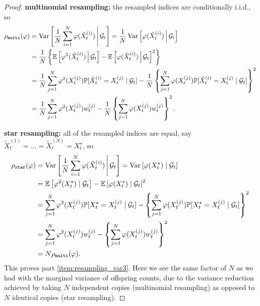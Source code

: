 \begin{proof}
\textbf{multinomial resampling:} the resampled indices are conditionally i.i.d., so
\begin{align*}
\rho_{\texttt{multi}}(\varphi)
&= \operatorname{Var}\left[ \frac{1}{N} \sum_{i=1}^N \varphi (\tilde{X}_t^{(i)}) 
        \,\middle|\, \mathcal{G}_t \right]
= \frac{1}{N} \operatorname{Var}\left[ \varphi (\tilde{X}_t^{(i)}) 
        \,\middle|\, \mathcal{G}_t \right] \\
&= \frac{1}{N} \left\{ \mathbb{E}\left[ \varphi^2(\tilde{X}_t^{(i)}) \,\middle|\, \mathcal{G}_t \right]
        - \mathbb{E}\left[ \varphi(\tilde{X}_t^{(i)}) \,\middle|\, \mathcal{G}_t \right]^2 \right\} \\
&= \frac{1}{N} \sum_{j=1}^N \varphi^2(X_t^{(j)}) 
        \mathbb{P}[\tilde{X}_t^{(i)} = X_t^{(j)} \mid \mathcal{G}_t ]
        - \frac{1}{N} \left\{ \sum_{j=1}^N \varphi(X_t^{(j)}) 
        \mathbb{P}[\tilde{X}_t^{(i)} = X_t^{(j)} \mid \mathcal{G}_t ] \right\}^2 \\
&= \frac{1}{N} \sum_{j=1}^N \varphi^2(X_t^{(j)}) w_t^{(j)}
        - \frac{1}{N} \left\{ \sum_{j=1}^N \varphi(X_t^{(j)}) w_t^{(j)} \right\}^2 .        
\end{align*}

\textbf{star resampling:} all of the resampled indices are equal, say $\tilde{X}_t^{(1)} = \dots = \tilde{X}_t^{(N)} = X_t^\star$, so
\begin{align*}
\rho_{\texttt{star}}(\varphi)
&= \operatorname{Var}\left[ \frac{1}{N} \sum_{i=1}^N \varphi(\tilde{X}_t^{(i)}) \,\middle|\, \mathcal{G}_t \right]
= \operatorname{Var}\left[ \varphi( X_t^\star) \mid \mathcal{G}_t \right] \\
&= \mathbb{E}\left[ \varphi^2( X_t^\star) \mid \mathcal{G}_t \right]
        - \mathbb{E}\left[ \varphi( X_t^\star) \mid \mathcal{G}_t \right]^2 \\
&= \sum_{j=1}^N \varphi^2(X_t^{(j)}) 
        \mathbb{P}[ X_t^\star = X_t^{(j)} \mid \mathcal{G}_t ]
        - \left\{ \sum_{j=1}^N \varphi(X_t^{(j)}) 
        \mathbb{P}[ X_t^\star = X_t^{(j)} \mid \mathcal{G}_t ] \right\}^2 \\
&= \sum_{j=1}^N \varphi^2(X_t^{(j)}) w_t^{(j)}
        - \left\{ \sum_{j=1}^N \varphi(X_t^{(j)}) w_t^{(j)} \right\}^2 \\
&= N \rho_{\texttt{multi}}(\varphi) .
\end{align*}
 This proves part \ref{item:resampling_var3}. Here we see the same factor of $N$ as we had with the marginal variance of offspring counts, due to the variance reduction achieved by taking $N$ independent copies (multinomial resampling) as opposed to $N$ identical copies (star resampling).


\end{proof}
